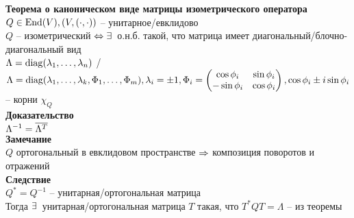 \documentclass[12pt]{article}
\begin{document}
\textbf{Теорема о каноническом виде матрицы изометрического оператора}\\
$Q \in \operatorname{End}(V), (V, (\cdot, \cdot))$ -- унитарное/евклидово\\
$Q$ -- изометрический $\Leftrightarrow \exists\,$ о.н.б. такой, что матрица имеет диагональный/блочно-диагональный вид\\
$ \Lambda = \operatorname{diag}( \lambda_1, \ldots, \lambda_n)$ / $ \Lambda = \operatorname{diag}(\lambda_1, \ldots, \lambda_k, \Phi_1, \ldots, \Phi_m), \lambda_i = \pm 1, \Phi_i = \begin{pmatrix}
    \cos \phi_i & \sin \phi_i\\
    -\sin \phi_i & \cos \phi_i
\end{pmatrix}, \cos \phi_i \pm i\sin \phi_i$ -- корни $\chi_Q$\\
\textbf{Доказательство}\\
$ \Lambda^{-1} = \overline{ \Lambda^T}$\\
\textbf{Замечание}\\
$Q$ ортогональный в евклидовом пространстве $\Rightarrow$ композиция поворотов и отражений\\
\textbf{Следствие}\\
$Q^* = Q^{-1}$ -- унитарная/ортогональная матрица\\
Тогда $\exists\,$ унитарная/ортогональная матрица $T$ такая, что $T^* Q T = \Lambda$ -- из теоремы\\
\end{document}
